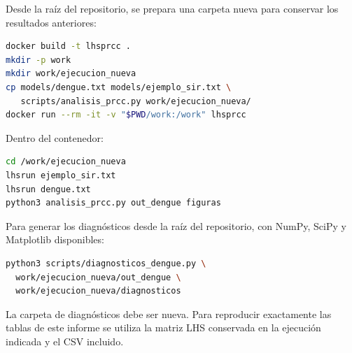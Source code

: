 \documentclass[12pt,spanish,oneside,openany]{MastersDoctoralThesis}
\numberwithin{equation}{section}
\begin{document}
Desde la raíz del repositorio, se prepara una carpeta nueva para conservar los resultados anteriores:
\begin{lstlisting}[language=bash]
docker build -t lhsprcc .
mkdir -p work
mkdir work/ejecucion_nueva
cp models/dengue.txt models/ejemplo_sir.txt \
   scripts/analisis_prcc.py work/ejecucion_nueva/
docker run --rm -it -v "$PWD/work:/work" lhsprcc
\end{lstlisting}
Dentro del contenedor:
\begin{lstlisting}[language=bash]
cd /work/ejecucion_nueva
lhsrun ejemplo_sir.txt
lhsrun dengue.txt
python3 analisis_prcc.py out_dengue figuras
\end{lstlisting}
Para generar los diagnósticos desde la raíz del repositorio, con NumPy, SciPy y Matplotlib disponibles:
\begin{lstlisting}[language=bash]
python3 scripts/diagnosticos_dengue.py \
  work/ejecucion_nueva/out_dengue \
  work/ejecucion_nueva/diagnosticos
\end{lstlisting}
La carpeta de diagnósticos debe ser nueva. Para reproducir exactamente las tablas de este informe se utiliza la matriz LHS conservada en la ejecución indicada y el CSV incluido.
\end{document}
